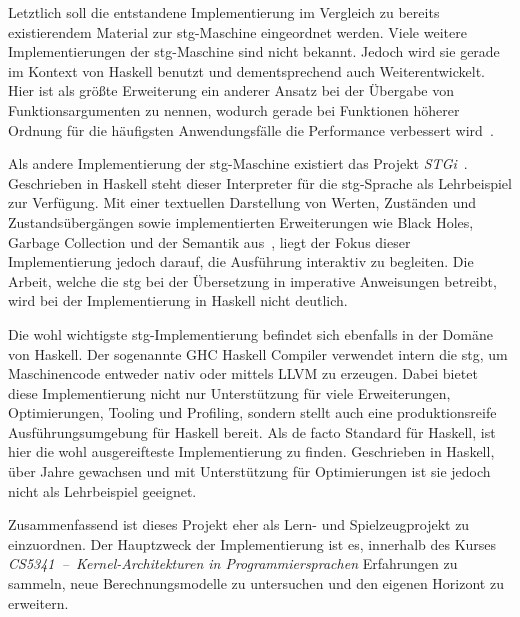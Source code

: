 Letztlich soll die entstandene Implementierung im Vergleich zu bereits existierendem Material zur \gls{stg}-Maschine eingeordnet werden.
Viele weitere Implementierungen der \gls{stg}-Maschine sind nicht bekannt.
Jedoch wird sie gerade im Kontext von Haskell benutzt und dementsprechend auch Weiterentwickelt.
Hier ist als größte Erweiterung ein anderer Ansatz bei der Übergabe von Funktionsargumenten zu nennen, wodurch gerade bei Funktionen höherer Ordnung für die häufigsten Anwendungsfälle die Performance verbessert wird~\cite{PeytonJones_FastCurry}.

Als andere Implementierung der \gls{stg}-Maschine existiert das Projekt \textit{STGi}~\cite{Luposchainsky_StgInterpreter}.
Geschrieben in Haskell steht dieser Interpreter für die \gls{stg}-Sprache als Lehrbeispiel zur Verfügung.
Mit einer textuellen Darstellung von Werten, Zuständen und Zustandsübergängen sowie implementierten Erweiterungen wie Black Holes, Garbage Collection und der Semantik aus~\cite{PeytonJones_FastCurry}, liegt der Fokus dieser Implementierung jedoch darauf, die Ausführung interaktiv zu begleiten.
Die Arbeit, welche die \gls{stg} bei der Übersetzung in imperative Anweisungen betreibt, wird bei der Implementierung in Haskell nicht deutlich.

Die wohl wichtigste \gls{stg}-Implementierung befindet sich ebenfalls in der Domäne von Haskell.
Der sogenannte GHC Haskell Compiler verwendet intern die \gls{stg}, um Maschinencode entweder nativ oder mittels LLVM zu erzeugen.
Dabei bietet diese Implementierung nicht nur Unterstützung für viele Erweiterungen, Optimierungen, Tooling und Profiling, sondern stellt auch eine produktionsreife Ausführungsumgebung für Haskell bereit.
Als de facto Standard für Haskell, ist hier die wohl ausgereifteste Implementierung zu finden.
Geschrieben in Haskell, über Jahre gewachsen und mit Unterstützung für Optimierungen ist sie jedoch nicht als Lehrbeispiel geeignet.

Zusammenfassend ist dieses Projekt eher als Lern- und Spielzeugprojekt zu einzuordnen.
Der Hauptzweck der Implementierung ist es, innerhalb des Kurses \textit{CS5341~--~Kernel-Architekturen in Programmiersprachen} Erfahrungen  zu sammeln, neue Berechnungsmodelle zu untersuchen und den eigenen Horizont zu erweitern.


